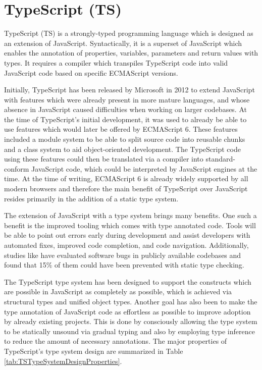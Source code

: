 \section{TypeScript (TS)}
\label{sec:TS}

TypeScript (TS) is a strongly-typed programming language which is
designed as an extension of JavaScript.  Syntactically, it is a
superset of JavaScript which enables the annotation of properties,
variables, parameters and return values with types.  It requires a
compiler which transpiles TypeScript code into valid JavaScript code
based on specific ECMAScript versions.

Initially, TypeScript has been released by Microsoft in 2012
\parencite{TSFirstRelease} to extend JavaScript with features which
were already present in more mature languages, and whose absence in
JavaScript caused difficulties when working on larger codebases.  At
the time of TypeScript's initial development, it was used to already
be able to use features which would later be offered by ECMAScript 6.
These features included a module system to be able to split source
code into reusable chunks and a class system to aid object-oriented
development.  The TypeScript code using these features could then be
translated via a compiler into standard-conform JavaScript code, which
could be interpreted by JavaScript engines at the time.  At the time
of writing, ECMAScript 6 is already widely supported by all modern
browsers and therefore the main benefit of TypeScript over JavaScript
resides primarily in the addition of a static type system.

The extension of JavaScript with a type system brings many benefits. 
One such a benefit is the improved tooling which comes with type annotated code. 
Tools will be able to point out errors early during development and assist developers with automated fixes, improved code completion, and code navigation. 
Additionally, studies like \cite{ToTypeOrNotToType} have evaluated software bugs in publicly available codebases and found that 15\% of them could have been prevented with static type checking.

The TypeScript type system has been designed to support the constructs which are possible in JavaScript as completely as possible, which is achieved via structural types and unified object types. 
Another goal has also been to make the type annotation of JavaScript code as effortless as possible to improve adoption by already existing projects. 
This is done by consciously allowing the type system to be statically unsound via gradual typing and also by employing type inference to reduce the amount of necessary annotations. 
The major properties of TypeScript's type system design are summarized in Table \ref{tab:TSTypeSystemDesignProperties}.

